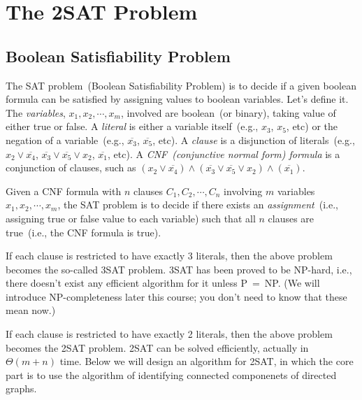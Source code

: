 \setcounter{definition}{0} \setcounter{property}{0} \setcounter{claim}{0} \setcounter{fact}{0} \setcounter{corollary}{0} \setcounter{figure}{0}
\setcounter{definition}{0} \setcounter{property}{0} \setcounter{claim}{0} \setcounter{fact}{0} \setcounter{corollary}{0}
\section{The 2SAT Problem}

\subsection*{Boolean Satisfiability Problem}

The SAT problem~(Boolean Satisfiability Problem) is 
to decide if a given boolean formula can be satisfied
by assigning values to boolean variables.
Let's define it. The \emph{variables}, $x_1, x_2, \cdots, x_m$, involved are
boolean~(or binary), taking value of either true or false.
A \emph{literal} is either a variable itself~(e.g., $x_3$, $x_5$, etc) or the negation of a variable~(e.g., $\overline{x_3}$, $\overline{x_5}$, etc).
A \emph{clause} is a disjunction of literals~(e.g., $x_2 \vee \overline{x_4}$, $\overline{x_3} \vee \overline{x_5} \vee x_2$, $\overline{x_1}$, etc).
A \emph{CNF~(conjunctive normal form) formula} is a conjunction of clauses, such as  
$(x_2 \vee \overline{x_4})\wedge (\overline{x_3} \vee \overline{x_5} \vee x_2) \wedge (\overline{x_1})$.

Given a CNF formula with $n$ clauses $C_1, C_2, \cdots, C_n$ involving $m$ variables
$x_1, x_2, \cdots, x_m$, the SAT problem is to decide if there exists an
\emph{assignment}~(i.e., assigning true or false value to each variable) such
that all $n$ clauses are true~(i.e., the CNF formula is true).

If each clause is restricted to have exactly 3 literals, then the above problem becomes the so-called 3SAT problem.
3SAT has been proved to be NP-hard, i.e., there doesn't exist any efficient algorithm for it unless P~=~NP.
(We will introduce NP-completeness later this course; you don't need to know that these mean now.)

If each clause is restricted to have exactly 2 literals, then the above problem becomes the 2SAT problem.
2SAT can be solved efficiently, actually in $\Theta(m + n)$ time.
Below we will design an algorithm for 2SAT, in which the core part is to use the algorithm of identifying connected componenets of directed graphs.

